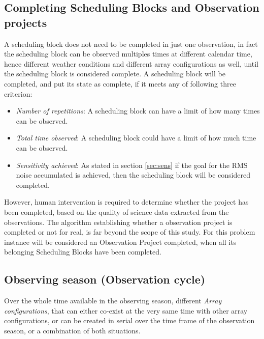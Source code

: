 \subsection{Completing Scheduling Blocks and Observation projects}
\label{subsec:completing-obs}
A scheduling block does not need to be completed in just one observation, in fact the scheduling block can be observed multiples times at different calendar time, hence different weather conditions and different array configurations as well, until the scheduling block is considered complete.
A scheduling block will be completed, and put its state as complete, if it meets any of following three criterion:
\begin{itemize}
	\item \textit{Number of repetitions}: A scheduling block can have a limit of how many times can be observed.
	\item \textit{Total time observed}: A scheduling block could have a limit of how much time can be observed.
	\item \textit{Sensitivity achieved}: As stated in section \ref{sec:sens} if the goal for the RMS noise accumulated is achieved, then the scheduling block will be considered completed.
\end{itemize} 

However, human intervention is required to determine whether the project has been completed, based on the quality of science data extracted from the observations. The algorithm establishing whether a observation project is completed or not for real, is far beyond the scope of this study. For this problem instance will be considered an Observation Project completed, when all its belonging Scheduling Blocks have been completed.

\subsection{Observing season (Observation cycle)}

Over the whole time available in the observing season, different \textit{Array configurations}, that can either co-exist at the very same time with other array configurations, or can be created in serial over the time frame of the observation season, or a combination of both situations.


